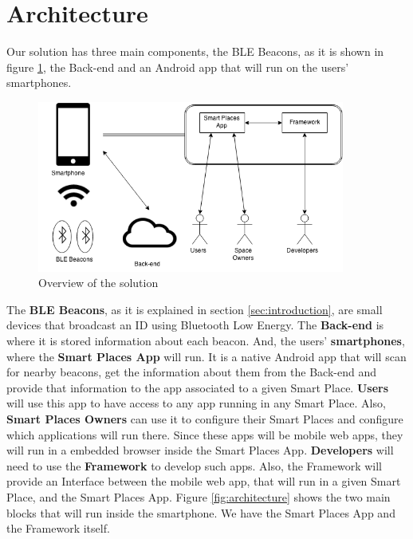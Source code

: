 
% 
% 


\section{Architecture}
\label{sec:architecture}
Our solution has three main components,
the BLE Beacons, as it is shown in figure 
\ref{fig:overview_architecture}, 
the Back-end and an Android app
that will run on the users' smartphones.
\begin{figure}[!ht]
  \centering
    \includegraphics[width=0.9\textwidth]{img/overview_architecture}
    \caption{Overview of the solution}
    \label{fig:overview_architecture}
\end{figure}
The \textbf{BLE Beacons}, as it is explained in section 
\ref{sec:introduction}, are small devices that broadcast
an ID using Bluetooth Low Energy. The \textbf{Back-end} is where it is
stored information about each beacon. And, the users'
\textbf{smartphones}, where the \textbf{Smart Places App} will run.
It is a native Android app that will scan for nearby beacons,
get the information about them from the Back-end and
provide that information to the app associated to a 
given Smart Place.
\textbf{Users} will use this app to have access
to any app running in any Smart Place.
Also, \textbf{Smart Places Owners} can use it to configure
their Smart Places and configure which applications
will run there.
Since these apps will be mobile web apps, they will run
in a embedded browser inside the Smart Places App.
\textbf{Developers} will need to use the \textbf{Framework} to
develop such apps. Also, the Framework will provide an
Interface between the mobile web app, that will run
in a given Smart Place, and the Smart Places App.
Figure \ref{fig:architecture} shows the two main
blocks that will run inside the smartphone.
We have the Smart Places App and the Framework itself.

